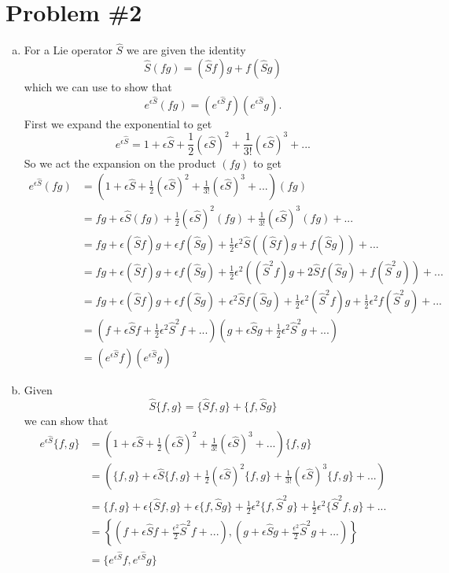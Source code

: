 \documentclass[11pt]{article}
\numberwithin{equation}{section}
\begin{document}
\pagebreak

\section{Problem \#2}
\begin{enumerate}[(a)]
\item For a Lie operator $\hat{S}$ we are given the identity
$$\hat{S}(fg) = (\hat{S}f)g + f(\hat{S}g)$$
which we can use to show that
$$e^{\epsilon\hat{S}}(fg) = (e^{\epsilon\hat{S}}f)(e^{\epsilon\hat{S}}g).$$
First we expand the exponential to get
$$e^{\epsilon\hat{S}} = 1 + \epsilon\hat{S} + \frac{1}{2}(\epsilon\hat{S})^2 + \frac{1}{3!}(\epsilon\hat{S})^3 + ...$$
So we act the expansion on the product $(fg)$ to get
\begin{align*}
e^{\epsilon\hat{S}}(fg) &= \left(1 + \epsilon\hat{S} + \frac{1}{2}(\epsilon\hat{S})^2 + \frac{1}{3!}(\epsilon\hat{S})^3 + ...\right)(fg)\\
&= fg + \epsilon\hat{S}(fg) + \frac{1}{2}(\epsilon\hat{S})^2(fg) + \frac{1}{3!}(\epsilon\hat{S})^3(fg) + ...\\
&= fg + \epsilon(\hat{S}f)g + \epsilon{f}(\hat{S}g) + \frac{1}{2}\epsilon^2\hat{S}\left((\hat{S}f)g + f(\hat{S}g)\right) + ...\\
&= fg + \epsilon(\hat{S}f)g + \epsilon{f}(\hat{S}g) + \frac{1}{2}\epsilon^2\left((\hat{S}^2f)g + 2\hat{S}f(\hat{S}g) + f(\hat{S}^2g)\right) + ...\\
&= fg + \epsilon(\hat{S}f)g + \epsilon{f}(\hat{S}g) +  \epsilon^2\hat{S}f(\hat{S}g) + \frac{1}{2}\epsilon^2(\hat{S}^2f)g  + \frac{1}{2}\epsilon^2f(\hat{S}^2g) + ...\\
&= \left(f + \epsilon\hat{S}f + \frac{1}{2}\epsilon^2\hat{S}^2f+...\right)\left(g + \epsilon\hat{S}g + \frac{1}{2}\epsilon^2\hat{S}^2g+...\right)\\
&=  (e^{\epsilon\hat{S}}f)(e^{\epsilon\hat{S}}g)
\end{align*}

\item Given 
$$\hat{S}\{f,g\} = \{\hat{S}f,g\} + \{f,\hat{S}g\}$$
we can show that 
\begin{align*}
e^{\epsilon\hat{S}}\{f,g\} &= \left(1 + \epsilon\hat{S} + \frac{1}{2}(\epsilon\hat{S})^2 + \frac{1}{3!}(\epsilon\hat{S})^3 + ...\right)\{f,g\}\\
&= \left(\{f,g\} + \epsilon\hat{S}\{f,g\} + \frac{1}{2}(\epsilon\hat{S})^2\{f,g\} + \frac{1}{3!}(\epsilon\hat{S})^3\{f,g\} + ...\right)\\
&= \{f,g\} + \epsilon\{\hat{S}f,g\} + \epsilon\{f,\hat{S}g\} + \frac{1}{2}\epsilon^2\{f,\hat{S}^2g\} + \frac{1}{2}\epsilon^2\{\hat{S}^2f,g\} + ...\\
&= \left\{\left(f+\epsilon\hat{S}f+\frac{\epsilon^2}{2}\hat{S}^2f+...\right),\left(g+\epsilon\hat{S}g+\frac{\epsilon^2}{2}\hat{S}^2g+...\right)\right\}\\
&= \{e^{\epsilon\hat{S}}f, e^{\epsilon\hat{S}}g\}
\end{align*}
\end{enumerate}
\end{document}
